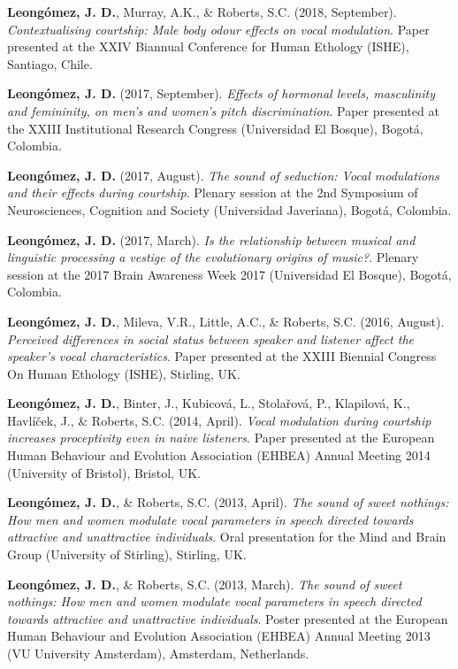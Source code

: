 \documentclass[11pt, a4paper]{awesome-cv}
\begin{document}
\textbf{Leongómez, J. D.}, Murray, A.K., \& Roberts, S.C. (2018,
September). \emph{Contextualising courtship: Male body odour effects on
vocal modulation}. Paper presented at the XXIV Biannual Conference for
Human Ethology (ISHE), Santiago, Chile.

\textbf{Leongómez, J. D.} (2017, September). \emph{Effects of hormonal
levels, masculinity and femininity, on men's and women's pitch
discrimination}. Paper presented at the XXIII Institutional Research
Congress (Universidad El Bosque), Bogotá, Colombia.

\textbf{Leongómez, J. D.} (2017, August). \emph{The sound of seduction:
Vocal modulations and their effects during courtship}. Plenary session
at the 2nd Symposium of Neurosciences, Cognition and Society
(Universidad Javeriana), Bogotá, Colombia.

\textbf{Leongómez, J. D.} (2017, March). \emph{Is the relationship
between musical and linguistic processing a vestige of the evolutionary
origins of music?}. Plenary session at the 2017 Brain Awareness Week
2017 (Universidad El Bosque), Bogotá, Colombia.

\textbf{Leongómez, J. D.}, Mileva, V.R., Little, A.C., \& Roberts, S.C.
(2016, August). \emph{Perceived differences in social status between
speaker and listener affect the speaker's vocal characteristics}. Paper
presented at the XXIII Biennial Congress On Human Ethology (ISHE),
Stirling, UK.

\textbf{Leongómez, J. D.}, Binter, J., Kubicová, L., Stolařová, P.,
Klapilová, K., Havlíček, J., \& Roberts, S.C. (2014, April). \emph{Vocal
modulation during courtship increases proceptivity even in naive
listeners}. Paper presented at the European Human Behaviour and
Evolution Association (EHBEA) Annual Meeting 2014 (University of
Bristol), Bristol, UK.

\textbf{Leongómez, J. D.}, \& Roberts, S.C. (2013, April). \emph{The
sound of sweet nothings: How men and women modulate vocal parameters in
speech directed towards attractive and unattractive individuals}. Oral
presentation for the Mind and Brain Group (University of Stirling),
Stirling, UK.

\textbf{Leongómez, J. D.}, \& Roberts, S.C. (2013, March). \emph{The
sound of sweet nothings: How men and women modulate vocal parameters in
speech directed towards attractive and unattractive individuals}. Poster
presented at the European Human Behaviour and Evolution Association
(EHBEA) Annual Meeting 2013 (VU University Amsterdam), Amsterdam,
Netherlands.
\end{document}
